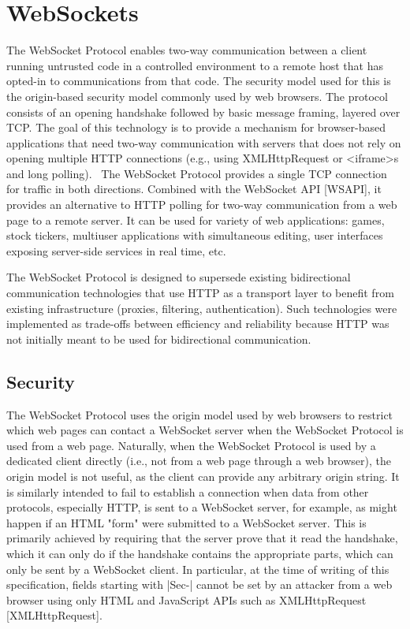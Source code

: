 \section{WebSockets}
The WebSocket Protocol enables two-way communication between a client running untrusted code in a controlled environment to a remote host that has opted-in to communications from that code.  The security model used for this is the origin-based security model commonly used by web browsers.  The protocol consists of an opening handshake followed by basic message framing, layered over TCP. The goal of this technology is to provide a mechanism for browser-based applications that need two-way communication with servers that does not rely on opening multiple HTTP connections (e.g., using XMLHttpRequest or <iframe>s and long polling).~\parencite{rfc6455}
The WebSocket Protocol provides a single TCP connection for traffic in both directions. Combined with the WebSocket API [WSAPI], it provides an alternative to HTTP polling for two-way communication from a web page to a remote server. It can be used for variety of web applications: games, stock tickers, multiuser applications with simultaneous editing, user interfaces exposing server-side services in real time, etc.

The WebSocket Protocol is designed to supersede existing bidirectional communication technologies that use HTTP as a transport layer to benefit from existing infrastructure (proxies, filtering, authentication). Such technologies were implemented as trade-offs between efficiency and reliability because HTTP was not initially meant to be used for bidirectional communication.

\subsection{Security}
The WebSocket Protocol uses the origin model used by web browsers to
restrict which web pages can contact a WebSocket server when the
WebSocket Protocol is used from a web page.  Naturally, when the
WebSocket Protocol is used by a dedicated client directly (i.e., not
from a web page through a web browser), the origin model is not
useful, as the client can provide any arbitrary origin string.
It is similarly intended to fail to establish a connection when data
from other protocols, especially HTTP, is sent to a WebSocket server,
for example, as might happen if an HTML "form" were submitted to a
WebSocket server.  This is primarily achieved by requiring that the
server prove that it read the handshake, which it can only do if the
handshake contains the appropriate parts, which can only be sent by a
WebSocket client.  In particular, at the time of writing of this
specification, fields starting with |Sec-| cannot be set by an
attacker from a web browser using only HTML and JavaScript APIs such
as XMLHttpRequest [XMLHttpRequest].

